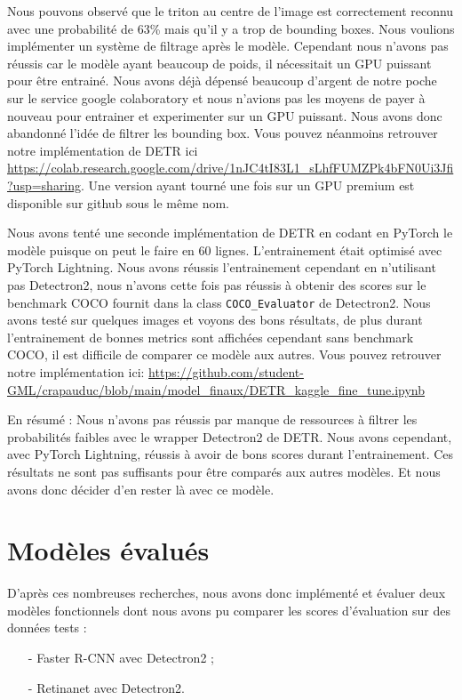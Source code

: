 Nous pouvons observé que le triton au centre de l'image est correctement reconnu avec une probabilité de 63\% mais qu'il y a trop de bounding boxes. Nous voulions implémenter un système de filtrage après le modèle. Cependant nous n'avons pas réussis car le modèle ayant beaucoup de poids, il nécessitait un GPU puissant pour être entrainé. Nous avons déjà dépensé beaucoup d'argent de notre poche sur le service google colaboratory et nous n'avions pas les moyens de payer à nouveau pour entrainer et experimenter sur un GPU puissant. Nous avons donc abandonné l'idée de filtrer les bounding box. Vous pouvez néanmoins retrouver notre implémentation de DETR ici \url{https://colab.research.google.com/drive/1nJC4tI83L1_sLhfFUMZPk4bFN0Ui3Jfi?usp=sharing}. Une version ayant tourné une fois sur un GPU premium est disponible sur github sous le même nom.

Nous avons tenté une seconde implémentation de DETR en codant en PyTorch le modèle puisque on peut le faire en 60 lignes. L'entrainement était optimisé avec PyTorch Lightning. Nous avons réussis l'entrainement cependant en n'utilisant pas Detectron2, nous n'avons cette fois pas réussis à obtenir des scores sur le benchmark COCO fournit dans la class \verb|COCO_Evaluator| de Detectron2. Nous avons testé sur quelques images et voyons des bons résultats, de plus durant l'entrainement de bonnes metrics sont affichées cependant sans benchmark COCO, il est difficile de comparer ce modèle aux autres. Vous pouvez retrouver notre implémentation ici: \url{https://github.com/student-GML/crapauduc/blob/main/model_finaux/DETR_kaggle_fine_tune.ipynb}

En résumé : Nous n'avons pas réussis par manque de ressources à filtrer les probabilités faibles avec le wrapper Detectron2 de DETR. Nous avons cependant, avec PyTorch Lightning, réussis à avoir de bons scores durant l'entrainement. Ces résultats ne sont pas suffisants pour être comparés aux autres modèles. Et nous avons donc décider d'en rester là avec ce modèle.

\section{Modèles évalués}
D'après ces nombreuses recherches, nous avons donc implémenté et évaluer deux modèles fonctionnels dont nous avons pu comparer les scores d'évaluation sur des données tests : 

\begin{itemize}
    \item[-] Faster R-CNN avec Detectron2 ;
    \item[-] Retinanet avec Detectron2.
\end{itemize}